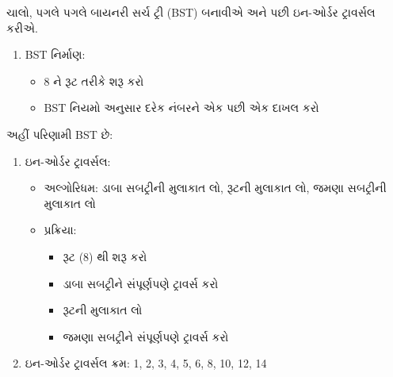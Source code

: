 ચાલો, પગલે પગલે બાયનરી સર્ચ ટ્રી (BST) બનાવીએ અને પછી ઇન-ઓર્ડર ટ્રાવર્સલ કરીએ.

\begin{enumerate}
\def\labelenumi{\arabic{enumi}.}
\tightlist
\item
  BST નિર્માણ:

  \begin{itemize}
  \tightlist
  \item
    8 ને રૂટ તરીકે શરૂ કરો
  \item
    BST નિયમો અનુસાર દરેક નંબરને એક પછી એક દાખલ કરો
  \end{itemize}
\end{enumerate}

અહીં પરિણામી BST છે:

\begin{Shaded}
\begin{Highlighting}[]

\end{Highlighting}
\end{Shaded}

\begin{enumerate}
\def\labelenumi{\arabic{enumi}.}
\setcounter{enumi}{1}
\tightlist
\item
  ઇન-ઓર્ડર ટ્રાવર્સલ:

  \begin{itemize}
  \tightlist
  \item
    અલ્ગોરિધમ: ડાબા સબટ્રીની મુલાકાત લો, રૂટની મુલાકાત લો, જમણા સબટ્રીની
    મુલાકાત લો
  \item
    પ્રક્રિયા:

    \begin{itemize}
    \tightlist
    \item
      રૂટ (8) થી શરૂ કરો
    \item
      ડાબા સબટ્રીને સંપૂર્ણપણે ટ્રાવર્સ કરો
    \item
      રૂટની મુલાકાત લો
    \item
      જમણા સબટ્રીને સંપૂર્ણપણે ટ્રાવર્સ કરો
    \end{itemize}
  \end{itemize}
\item
  ઇન-ઓર્ડર ટ્રાવર્સલ ક્રમ: 1, 2, 3, 4, 5, 6, 8, 10, 12, 14
\end{enumerate}

